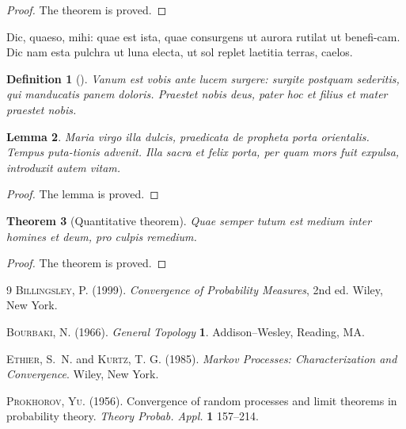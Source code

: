 \documentclass{bln}
\newtheorem{thm}{Theorem}[section]
\newtheorem{defn}[thm]{Definition}
\newtheorem{lem}[thm]{Lemma}
\begin{document}
\begin{proof}
The theorem is proved.
\end{proof}

Dic, quaeso, mihi: quae est ista, quae consurgens ut aurora rutilat
ut benefi-cam.  Dic nam esta pulchra ut luna electa, ut sol replet
laetitia terras, caelos.

\begin{defn}[\cite{r1}]\label{clas}
Vanum est vobis ante lucem surgere: surgite postquam
sederitis, qui manducatis panem doloris. Praestet nobis deus, pater
hoc et filius et mater praestet nobis.
\end{defn}

\begin{lem}
Maria virgo illa dulcis, praedicata de
propheta porta orientalis. Tempus puta-tionis advenit. Illa sacra et
felix porta, per quam mors fuit expulsa, introduxit autem vitam.
\end{lem}

\begin{proof}
The lemma is proved.
\end{proof}

\begin{thm}[Quantitative theorem]
Quae semper tutum est medium inter homines et deum, pro culpis remedium.
\end{thm}

\begin{proof}
The theorem is proved.
\end{proof}

\begin{thebibliography}{9}
\textsc{Billingsley, P.} (1999). \textit{Convergence of
Probability Measures}, 2nd ed.
Wiley, New York.

\textsc{Bourbaki, N.}  (1966). \textit{General Topology}  \textbf{1}.
Addison--Wesley, Reading, MA.

\textsc{Ethier, S.~N.} and \textsc{Kurtz, T. G.} (1985).
\textit{Markov Processes: Characterization and Convergence}.
Wiley, New York.

\textsc{Prokhorov, Yu.} (1956).
Convergence of random processes and limit theorems in probability
theory. \textit{Theory  Probab.  Appl.}
\textbf{1} 157--214.

\end{thebibliography}
\end{document}
